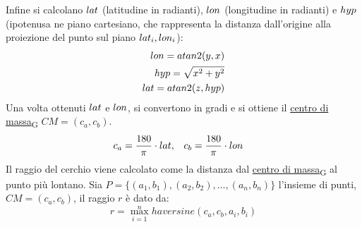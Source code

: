 Infine si calcolano ${lat}$ (latitudine in radianti), ${lon}$ (longitudine in radianti) e ${hyp}$ (ipotenusa ne piano cartesiano, che rappresenta la distanza dall'origine alla proiezione del punto sul piano ${lat}_i, {lon}_i$):
\begin{align*}
	{lon} = {atan2}(y, x) \\
	{hyp} = \sqrt{x^2 + y^2}     \\
	{lat} = {atan2}(z, {hyp})
\end{align*}
Una volta ottenuti ${lat}$ e ${lon}$, si convertono in gradi e si ottiene il \href{https://7last.github.io/docs/pb/documentazione-interna/glossario\#centro-di-massa}{centro di massa\textsubscript{G}} $CM = (c_a, c_b)$.
\begin{align*}
	c_a = \frac{180}{\pi} \cdot {lat}, & \quad c_b = \frac{180}{\pi} \cdot {lon}
\end{align*}
Il raggio del cerchio viene calcolato come la distanza dal \href{https://7last.github.io/docs/pb/documentazione-interna/glossario\#centro-di-massa}{centro di massa\textsubscript{G}} al punto più lontano. Sia $P = \{(a_1, b_1), (a_2, b_2), \ldots, (a_n, b_n)\}$ l'insieme di punti, $CM = (c_a, c_b)$, il
raggio $r$ è dato da:
\[
	r = \max_{i=1}^{n} haversine(c_a, c_b, a_i, b_i)
\]


